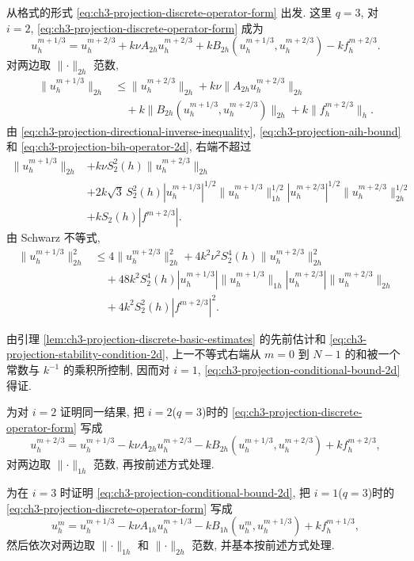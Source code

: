 \begin{Proof}
从格式的形式 \eqref{eq:ch3-projection-discrete-operator-form} 出发. 这里 $q=3$, 对 $i=2$, \eqref{eq:ch3-projection-discrete-operator-form} 成为
\[
u_h^{m+1/3}=u_h^{m+2/3}
+k\nu A_{2h}u_h^{m+2/3}
+kB_{2h}(u_h^{m+1/3},u_h^{m+2/3})
-kf_h^{m+2/3}.
\]
对两边取 $\lVert\cdot\rVert_{2h}$ 范数,
\[
\begin{aligned}
\lVert u_h^{m+1/3}\rVert_{2h}
&\leq\lVert u_h^{m+2/3}\rVert_{2h}
+k\nu\lVert A_{2h}u_h^{m+2/3}\rVert_{2h}\\
&\quad+k\lVert B_{2h}(u_h^{m+1/3},u_h^{m+2/3})\rVert_{2h}
+k\lVert f_h^{m+2/3}\rVert_h.
\end{aligned}
\]
由 \eqref{eq:ch3-projection-directional-inverse-inequality}, \eqref{eq:ch3-projection-aih-bound} 和 \eqref{eq:ch3-projection-bih-operator-2d}, 右端不超过
\[
\begin{aligned}
\lVert u_h^{m+1/3}\rVert_{2h}
&+k\nu S_2^2(h)\lVert u_h^{m+2/3}\rVert_{2h}\\
&+2k\sqrt3\,S_2^2(h)|u_h^{m+1/3}|^{1/2}
\lVert u_h^{m+1/3}\rVert_{1h}^{1/2}
|u_h^{m+2/3}|^{1/2}\lVert u_h^{m+2/3}\rVert_{2h}^{1/2}\\
&+kS_2(h)|f^{m+2/3}|.
\end{aligned}
\]
由 Schwarz 不等式,
\[
\begin{aligned}
\lVert u_h^{m+1/3}\rVert_{2h}^2
&\leq4\lVert u_h^{m+2/3}\rVert_{2h}^2
+4k^2\nu^2S_2^4(h)\lVert u_h^{m+2/3}\rVert_{2h}^2\\
&\quad+48k^2S_2^4(h)|u_h^{m+1/3}|
\lVert u_h^{m+1/3}\rVert_{1h}
|u_h^{m+2/3}|\lVert u_h^{m+2/3}\rVert_{2h}\\
&\quad+4k^2S_2^2(h)|f^{m+2/3}|^2.
\end{aligned}
\]

\hypertarget{chapter-03-page-300}{}
由引理 \ref{lem:ch3-projection-discrete-basic-estimates} 的先前估计和 \eqref{eq:ch3-projection-stability-condition-2d}, 上一不等式右端从 $m=0$ 到 $N-1$ 的和被一个常数与 $k^{-1}$ 的乘积所控制, 因而对 $i=1$, \eqref{eq:ch3-projection-conditional-bound-2d} 得证.

为对 $i=2$ 证明同一结果, 把 $i=2$($q=3$)时的 \eqref{eq:ch3-projection-discrete-operator-form} 写成
\[
u_h^{m+2/3}=u_h^{m+1/3}
-k\nu A_{2h}u_h^{m+2/3}
-kB_{2h}(u_h^{m+1/3},u_h^{m+2/3})
+kf_h^{m+2/3},
\]
对两边取 $\lVert\cdot\rVert_{1h}$ 范数, 再按前述方式处理.

为在 $i=3$ 时证明 \eqref{eq:ch3-projection-conditional-bound-2d}, 把 $i=1$($q=3$)时的 \eqref{eq:ch3-projection-discrete-operator-form} 写成
\[
u_h^m=u_h^{m+1/3}
-k\nu A_{1h}u_h^{m+1/3}
-kB_{1h}(u_h^m,u_h^{m+1/3})
+kf_h^{m+1/3},
\]
然后依次对两边取 $\lVert\cdot\rVert_{1h}$ 和 $\lVert\cdot\rVert_{2h}$ 范数, 并基本按前述方式处理.
\end{Proof}


